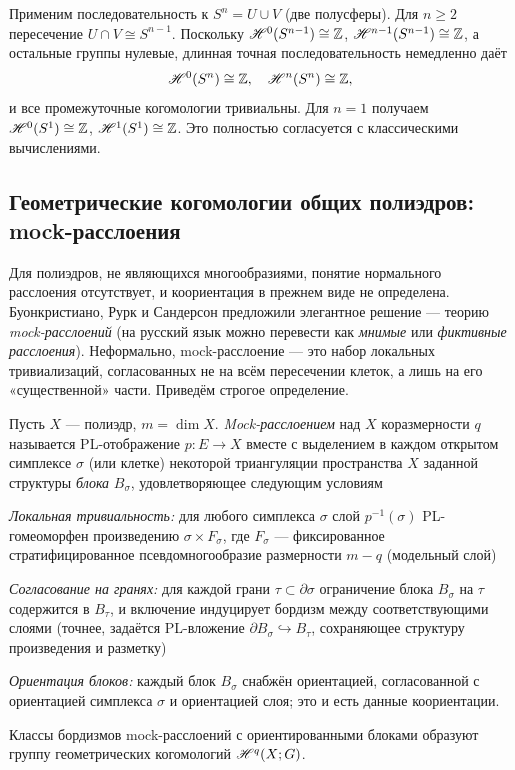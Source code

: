 \documentclass[12pt]{article}
\begin{document}
\begin{example}
Применим последовательность к $S^n = U \cup V$ (две полусферы). Для $n\ge 2$ пересечение $U\cap V \cong S^{n-1}$. Поскольку $\mathscr{H}^{0}(S^{n-1}) \cong \mathbb Z$, $\mathscr{H}^{n-1}(S^{n-1}) \cong \mathbb Z$, а остальные группы нулевые, длинная точная последовательность немедленно даёт
\[
\mathscr{H}^0(S^n) \cong \mathbb Z,\quad \mathscr{H}^n(S^n) \cong \mathbb Z,
\]
и все промежуточные когомологии тривиальны. Для $n=1$ получаем $\mathscr{H}^0(S^1)\cong \mathbb Z$, $\mathscr{H}^1(S^1)\cong \mathbb Z$. Это полностью согласуется с классическими вычислениями.
\end{example}

\subsection{Геометрические когомологии общих полиэдров: mock-расслоения}

Для полиэдров, не являющихся многообразиями, понятие нормального расслоения отсутствует, и коориентация в прежнем виде не определена. Буонкристиано, Рурк и Сандерсон предложили элегантное решение --- теорию \emph{mock-расслоений} (на русский язык можно перевести как \emph{мнимые} или \emph{фиктивные расслоения}). Неформально, mock-расслоение --- это набор локальных тривиализаций, согласованных не на всём пересечении клеток, а лишь на его «существенной» части. Приведём строгое определение.

\begin{definition}\label{def:mock}
Пусть $X$ --- полиэдр, $m = \dim X$. \emph{Mock-расслоением} над $X$ коразмерности $q$ называется PL-отображение $p: E \to X$ вместе с выделением в каждом открытом симплексе $\sigma$ (или клетке) некоторой триангуляции пространства $X$ заданной структуры \emph{блока} $B_\sigma$, удовлетворяющее следующим условиям
\begin{conditions}
\item \emph{Локальная тривиальность:} для любого симплекса $\sigma$ слой $p^{-1}(\sigma)$ PL-гомеоморфен произведению $\sigma \times F_\sigma$, где $F_\sigma$ --- фиксированное стратифицированное псевдомногообразие размерности $m-q$ (модельный слой)
\item \emph{Согласование на гранях:} для каждой грани $\tau \subset \partial \sigma$ ограничение блока $B_\sigma$ на $\tau$ содержится в $B_\tau$, и включение индуцирует бордизм между соответствующими слоями (точнее, задаётся PL-вложение $\partial B_\sigma \hookrightarrow B_\tau$, сохраняющее структуру произведения и разметку)
\item \emph{Ориентация блоков:} каждый блок $B_\sigma$ снабжён ориентацией, согласованной с ориентацией симплекса $\sigma$ и ориентацией слоя; это и есть данные коориентации.
\end{conditions}
Классы бордизмов mock-расслоений с ориентированными блоками образуют группу геометрических когомологий $\mathscr{H}^q(X;G)$.
\end{definition}
\end{document}
